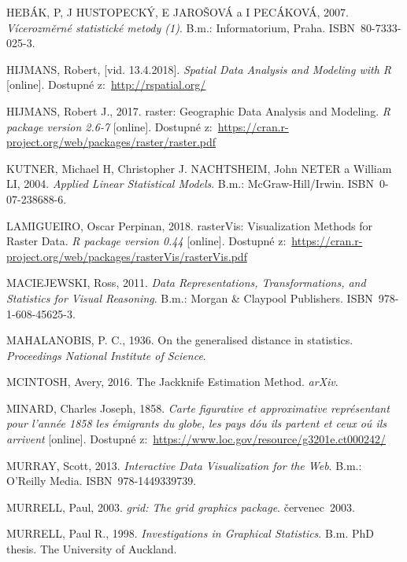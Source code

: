 \documentclass[12pt,]{article}
\begin{document}
\hypertarget{ref-vicerozm_stat}{}
HEBÁK, P, J HUSTOPECKÝ, E JAROŠOVÁ a I PECÁKOVÁ, 2007.
\emph{Vícerozměrné statistické metody (1)}. B.m.: Informatorium, Praha.
ISBN~80-7333-025-3.

\hypertarget{ref-spatial2}{}
HIJMANS, Robert, {[}vid. 13.4.2018{]}. \emph{Spatial Data Analysis and
Modeling with R} {[}online{]}. Dostupné z:~\url{http://rspatial.org/}

\hypertarget{ref-raster}{}
HIJMANS, Robert J., 2017. raster: Geographic Data Analysis and Modeling.
\emph{R package version 2.6-7} {[}online{]}. Dostupné
z:~\url{https://cran.r-project.org/web/packages/raster/raster.pdf}

\hypertarget{ref-kutner_transform}{}
KUTNER, Michael H, Christopher J. NACHTSHEIM, John NETER a William LI,
2004. \emph{Applied Linear Statistical Models}. B.m.: McGraw-Hill/Irwin.
ISBN~0-07-238688-6.

\hypertarget{ref-rasterVis}{}
LAMIGUEIRO, Oscar Perpinan, 2018. rasterVis: Visualization Methods for
Raster Data. \emph{R package version 0.44} {[}online{]}. Dostupné
z:~\url{https://cran.r-project.org/web/packages/rasterVis/rasterVis.pdf}

\hypertarget{ref-datarep2011}{}
MACIEJEWSKI, Ross, 2011. \emph{Data Representations, Transformations,
and Statistics for Visual Reasoning}. B.m.: Morgan \& Claypool
Publishers. ISBN~978-1-608-45625-3.

\hypertarget{ref-mbdist}{}
MAHALANOBIS, P. C., 1936. On the generalised distance in statistics.
\emph{Proceedings National Institute of Science}.

\hypertarget{ref-mcintosh2016}{}
MCINTOSH, Avery, 2016. The Jackknife Estimation Method. \emph{arXiv}.

\hypertarget{ref-minard1858}{}
MINARD, Charles Joseph, 1858. \emph{Carte figurative et approximative
représentant pour l'année 1858 les émigrants du globe, les pays dóu ils
partent et ceux oú ils arrivent} {[}online{]}. Dostupné
z:~\url{https://www.loc.gov/resource/g3201e.ct000242/}

\hypertarget{ref-murray}{}
MURRAY, Scott, 2013. \emph{Interactive Data Visualization for the Web}.
B.m.: O'Reilly Media. ISBN~978-1449339739.

\hypertarget{ref-murrell2003}{}
MURRELL, Paul, 2003. \emph{grid: The grid graphics package}.
červenec~2003.

\hypertarget{ref-murrell1998}{}
MURRELL, Paul R., 1998. \emph{Investigations in Graphical Statistics}.
B.m. PhD thesis. The University of Auckland.
\end{document}
